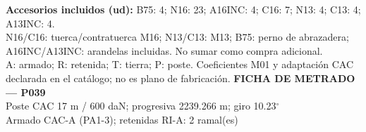 \begingroup\scriptsize
\textbf{Accesorios incluidos (ud):} B75: 4; N16: 23; A16INC: 4; C16: 7; N13: 4; C13: 4; A13INC: 4.\\
N16/C16: tuerca/contratuerca M16; N13/C13: M13; B75: perno de abrazadera; A16INC/A13INC: arandelas incluidas. No sumar como compra adicional.\\
A: armado; R: retenida; T: tierra; P: poste. Coeficientes M01 y adaptación CAC declarada en el catálogo; no es plano de fabricación.
\endgroup\endgroup
\clearpage{}
\begingroup\small\setlength{\parskip}{3pt}\renewcommand{\arraystretch}{1.05}
\textbf{\large FICHA DE METRADO — P039}\\[4pt]
Poste CAC 17 m / 600 daN; progresiva 2239.266 m; giro 10.23\ensuremath{^\circ}\\
Armado CAC-A (PA1-3); retenidas RI-A: 2 ramal(es)\\
\begingroup\scriptsize
